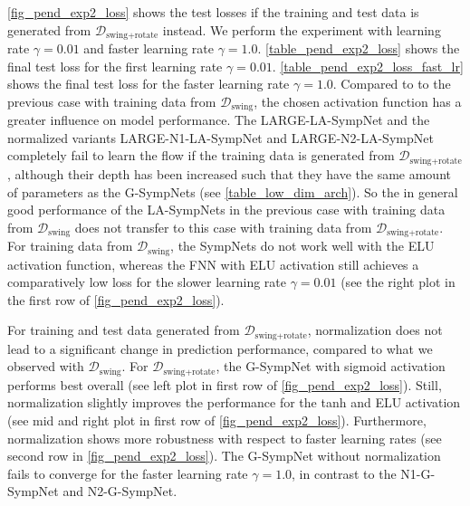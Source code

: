 \documentclass[twoside,a4paper]{article}
\begin{document}
\cref{fig_pend_exp2_loss} shows the test losses if the training and test data
is generated from $\mathcal{D}_{\text{swing+rotate}}$ instead.
We perform the experiment with learning rate $\gamma = 0.01$ and faster learning rate $\gamma = 1.0$.
\cref{table_pend_exp2_loss} shows the final test loss for the first learning rate $\gamma = 0.01$.
\cref{table_pend_exp2_loss_fast_lr} shows the final test loss for the faster learning rate $\gamma = 1.0$.
Compared to to the previous case with training data from $\mathcal{D}_{\text{swing}}$,
the chosen activation function has a greater influence on model performance.
The LARGE-LA-SympNet and the normalized variants LARGE-N1-LA-SympNet and LARGE-N2-LA-SympNet completely fail to learn the
flow if the training data is generated from $\mathcal{D}_{\text{swing+rotate}}$, 
although their depth has been increased such that they have the same amount of parameters 
as the G-SympNets (see \cref{table_low_dim_arch}). So the in general good performance of the 
LA-SympNets in the previous case with training data from $\mathcal{D}_{\text{swing}}$ 
does not transfer to this case with training data from $\mathcal{D}_{\text{swing+rotate}}$.
For training data from $\mathcal{D}_{\text{swing}}$, the SympNets
do not work well with the ELU activation function, whereas the FNN with ELU activation still achieves 
a comparatively low loss for the slower learning rate $\gamma = 0.01$ (see the right plot in the
first row of \cref{fig_pend_exp2_loss}).

For training and test data generated from $\mathcal{D}_{\text{swing+rotate}}$, 
normalization does not lead to a significant change in prediction performance, compared to
what we observed with $\mathcal{D}_{\text{swing}}$. For $\mathcal{D}_{\text{swing+rotate}}$,
the G-SympNet with sigmoid activation performs best overall
(see left plot in first row of \cref{fig_pend_exp2_loss}). Still, normalization slightly improves the
performance for the tanh and ELU activation (see 
mid and right plot in first row of \cref{fig_pend_exp2_loss}).
Furthermore, normalization shows more robustness with respect to faster learning rates
(see second row in \cref{fig_pend_exp2_loss}). The G-SympNet without normalization fails to converge
for the faster learning rate $\gamma = 1.0$, in contrast to the N1-G-SympNet and N2-G-SympNet.
\end{document}
